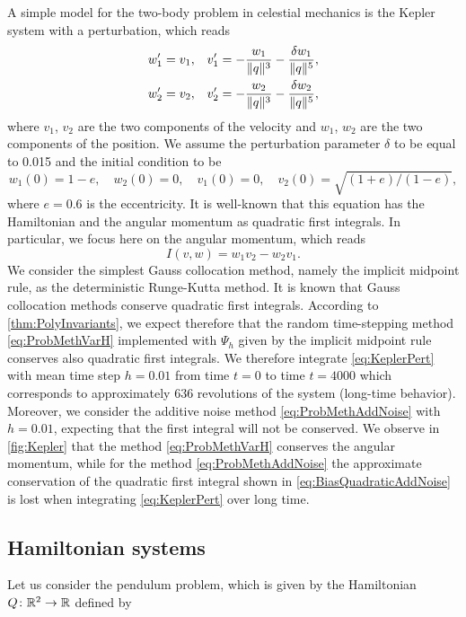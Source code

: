 \documentclass[10pt]{article}
\begin{document}
A simple model for the two-body problem in celestial mechanics is the Kepler system with a perturbation, which reads
\begin{equation}\label{eq:KeplerPert}
\begin{aligned}
	w_1' &= v_1, && v_1' = -\frac{w_1}{\lVert q\rVert^3} - \frac{\delta w_1}{\lVert q\rVert^5}, \\
	w_2' &= v_2, && v_2' = -\frac{w_2}{\lVert q\rVert^3} - \frac{\delta w_2}{\lVert q\rVert^5},
\end{aligned}
\end{equation}
where $v_1$, $v_2$ are the two components of the velocity and $w_1$, $w_2$ are the two components of the position. We assume the perturbation parameter $\delta$ to be equal to 0.015 and the initial condition to be
\begin{equation}
	w_1(0) = 1 - e,\quad w_2(0) = 0, \quad v_1(0) = 0, \quad v_2(0) = \sqrt{(1 + e)/(1 − e)},
\end{equation}
where $e = 0.6$ is the eccentricity. It is well-known that this equation has the Hamiltonian and the angular momentum as quadratic first integrals. In particular, we focus here on the angular momentum, which reads
\begin{equation}
	I(v, w) = w_1v_2 - w_2v_1.
\end{equation}
We consider the simplest Gauss collocation method, namely the implicit midpoint rule, as the deterministic Runge-Kutta method. It is known that Gauss collocation methods conserve quadratic first integrals. According to \cref{thm:PolyInvariants}, we expect therefore that the random time-stepping method \eqref{eq:ProbMethVarH} implemented with $\Psi_h$ given by the implicit midpoint rule conserves also quadratic first integrals. We therefore integrate \eqref{eq:KeplerPert} with mean time step $h = 0.01$ from time $t = 0$ to time $t = 4000$ which corresponds to approximately $636$ revolutions of the system (long-time behavior). Moreover, we consider the additive noise method \eqref{eq:ProbMethAddNoise} with $h = 0.01$, expecting that the first integral will not be conserved. We observe in \cref{fig:Kepler} that the method \eqref{eq:ProbMethVarH} conserves the angular momentum, while for the method \eqref{eq:ProbMethAddNoise} the approximate conservation of the quadratic first integral shown in \eqref{eq:BiasQuadraticAddNoise} is lost when integrating \eqref{eq:KeplerPert} over long time.

\subsection{Hamiltonian systems} Let us consider the pendulum problem, which is given by the Hamiltonian $Q \colon \mathbb{R}^2 \to \mathbb{R}$ defined by
\end{document}
